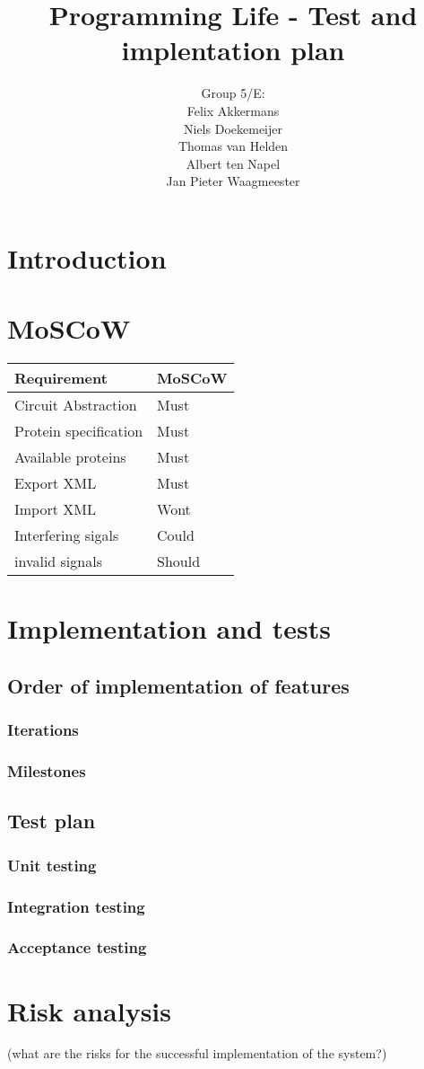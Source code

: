 \documentclass[a4paper]{article}
\title{Programming Life - Test and implentation plan }
\author{Group 5/E:\\
Felix Akkermans \\
Niels Doekemeijer \\
Thomas van Helden \\
Albert ten Napel \\
Jan Pieter Waagmeester}
\begin{document}
\maketitle

\vfill

\small{\tableofcontents}
\pagebreak

\section{Introduction}

\section{MoSCoW}
\begin{tabular}{ll}
Requirement & MoSCoW\\[2mm] \hline
Circuit Abstraction & Must \\
Protein specification & Must \\
Available proteins & Must \\
Export XML &  Must \\
Import XML & Wont \\
Interfering sigals & Could \\
invalid signals & Should \\
\end{tabular}

\section{Implementation and tests}

\subsection{Order of implementation of features}

\subsubsection{Iterations}

\subsubsection{Milestones}

\subsection{Test plan}

\subsubsection{Unit testing}

\subsubsection{Integration testing}

\subsubsection{Acceptance testing}

\section{Risk analysis}
(what are the risks for the successful implementation of the system?)
\end{document}

